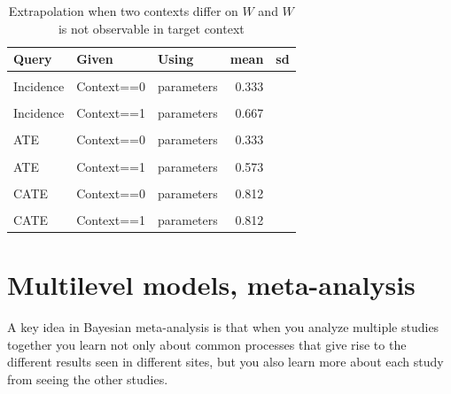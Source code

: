 \documentclass[
  12pt,
]{book}
\begin{document}
\begin{table}

\caption{\label{tab:appev4}Extrapolation when two contexts differ on $W$ and $W$ is not observable in target context}
\centering
\begin{tabular}[t]{lllrr}
\toprule
Query & Given & Using & mean & sd\\
\midrule
\cellcolor{gray!6}{Incidence} & \cellcolor{gray!6}{Context==0} & \cellcolor{gray!6}{posteriors} & \cellcolor{gray!6}{0.329} & \cellcolor{gray!6}{0.007}\\
Incidence & Context==0 & parameters & 0.333 & \\
\cellcolor{gray!6}{Incidence} & \cellcolor{gray!6}{Context==1} & \cellcolor{gray!6}{posteriors} & \cellcolor{gray!6}{0.667} & \cellcolor{gray!6}{0.007}\\
Incidence & Context==1 & parameters & 0.667 & \\
\cellcolor{gray!6}{ATE} & \cellcolor{gray!6}{Context==0} & \cellcolor{gray!6}{posteriors} & \cellcolor{gray!6}{0.314} & \cellcolor{gray!6}{0.012}\\
\addlinespace
ATE & Context==0 & parameters & 0.333 & \\
\cellcolor{gray!6}{ATE} & \cellcolor{gray!6}{Context==1} & \cellcolor{gray!6}{posteriors} & \cellcolor{gray!6}{0.560} & \cellcolor{gray!6}{0.009}\\
ATE & Context==1 & parameters & 0.573 & \\
\cellcolor{gray!6}{CATE} & \cellcolor{gray!6}{Context==0} & \cellcolor{gray!6}{posteriors} & \cellcolor{gray!6}{0.801} & \cellcolor{gray!6}{0.009}\\
CATE & Context==0 & parameters & 0.812 & \\
\addlinespace
\cellcolor{gray!6}{CATE} & \cellcolor{gray!6}{Context==1} & \cellcolor{gray!6}{posteriors} & \cellcolor{gray!6}{0.801} & \cellcolor{gray!6}{0.009}\\
CATE & Context==1 & parameters & 0.812 & \\
\bottomrule
\end{tabular}
\end{table}

\hypertarget{multilevel-models-meta-analysis}{%
\section{Multilevel models, meta-analysis}\label{multilevel-models-meta-analysis}}

A key idea in Bayesian meta-analysis is that when you analyze multiple studies together you learn not only about common processes that give rise to the different results seen in different sites, but you also learn more about each study from seeing the other studies.
\end{document}
